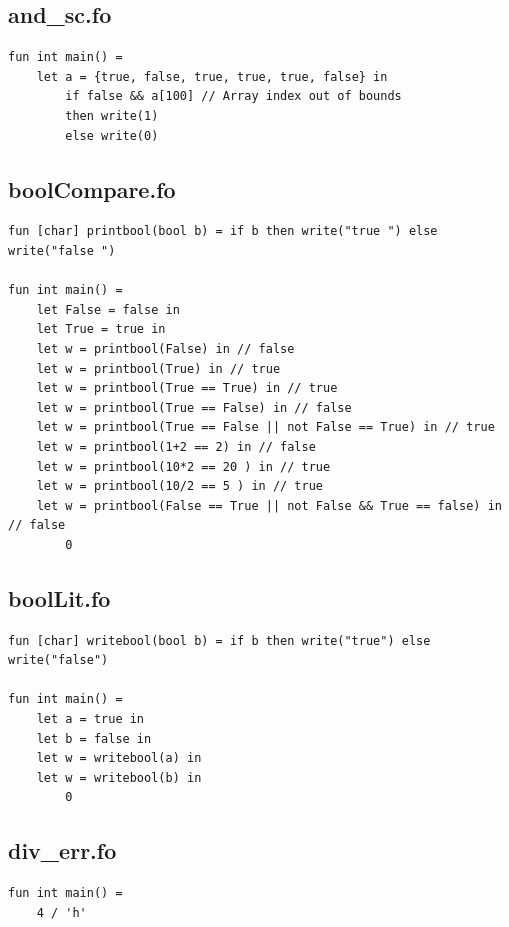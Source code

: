 \documentclass[11pt]{article}
\begin{document}
    \subsection{and\_sc.fo}
    \begin{lstlisting}[basicstyle=\small]
fun int main() =
    let a = {true, false, true, true, true, false} in
        if false && a[100] // Array index out of bounds
        then write(1)
        else write(0)
    \end{lstlisting}

    \subsection{boolCompare.fo}
    \begin{lstlisting}[basicstyle=\small]
fun [char] printbool(bool b) = if b then write("true ") else write("false ")

fun int main() =
    let False = false in
    let True = true in
    let w = printbool(False) in // false
    let w = printbool(True) in // true
    let w = printbool(True == True) in // true
    let w = printbool(True == False) in // false
    let w = printbool(True == False || not False == True) in // true
    let w = printbool(1+2 == 2) in // false
    let w = printbool(10*2 == 20 ) in // true
    let w = printbool(10/2 == 5 ) in // true
    let w = printbool(False == True || not False && True == false) in // false
        0
    \end{lstlisting}

    \subsection{boolLit.fo}
    \begin{lstlisting}[basicstyle=\small]
fun [char] writebool(bool b) = if b then write("true") else write("false")

fun int main() =
    let a = true in
    let b = false in
    let w = writebool(a) in
    let w = writebool(b) in
        0
    \end{lstlisting}

    \subsection{div\_err.fo}
    \begin{lstlisting}[basicstyle=\small]
fun int main() =
    4 / 'h'
    \end{lstlisting}
\end{document}
